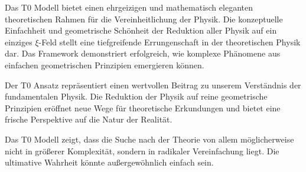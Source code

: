\documentclass[12pt,a4paper]{report}
\begin{document}
	Das T0 Modell bietet einen ehrgeizigen und mathematisch eleganten theoretischen Rahmen für die Vereinheitlichung der Physik. Die konzeptuelle Einfachheit und geometrische Schönheit der Reduktion aller Physik auf ein einziges $\xi$-Feld stellt eine tiefgreifende Errungenschaft in der theoretischen Physik dar. Das Framework demonstriert erfolgreich, wie komplexe Phänomene aus einfachen geometrischen Prinzipien emergieren können.
	
	Der T0 Ansatz repräsentiert einen wertvollen Beitrag zu unserem Verständnis der fundamentalen Physik. Die Reduktion der Physik auf reine geometrische Prinzipien eröffnet neue Wege für theoretische Erkundungen und bietet eine frische Perspektive auf die Natur der Realität.
	
	\begin{revolutionaer}
		Das T0 Modell zeigt, dass die Suche nach der Theorie von allem möglicherweise nicht in größerer Komplexität, sondern in radikaler Vereinfachung liegt. Die ultimative Wahrheit könnte außergewöhnlich einfach sein.
	\end{revolutionaer}
	
\end{document}
